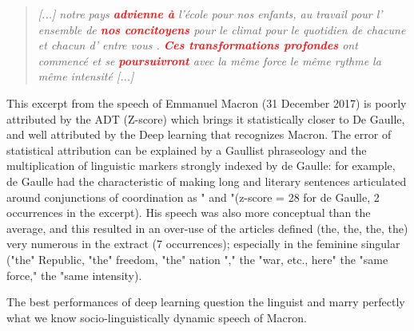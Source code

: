 \begin{quote}
\textit{[...] notre pays \textcolor{red}{\textbf{advienne à}} l'école pour nos enfants, au travail pour l' ensemble de \textcolor{red}{\textbf{nos concitoyens}} pour le climat pour le quotidien de chacune et chacun d' entre vous . \textcolor{red}{\textbf{Ces transformations profondes}} ont commencé et se \textcolor{red}{\textbf{poursuivront}} avec la même force le même rythme la même intensité [...]} 
\end{quote}

This excerpt from the speech of Emmanuel Macron (31 December 2017) is poorly attributed by the ADT (Z-score) which brings it statistically closer to De Gaulle, and well attributed by the Deep learning that recognizes Macron.
The error of statistical attribution can be explained by a Gaullist phraseology and the multiplication of linguistic markers strongly indexed by de Gaulle: for example, de Gaulle had the characteristic of making long and literary sentences articulated around conjunctions of coordination as " and "(z-score = 28 for de Gaulle, 2 occurrences in the excerpt). His speech was also more conceptual than the average, and this resulted in an over-use of the articles defined (the, the, the, the) very numerous in the extract (7 occurrences); especially in the feminine singular ("the" Republic, "the" freedom, "the" nation "," the "war, etc., here" the "same force," the "same intensity).

The best performances of deep learning question the linguist and marry perfectly what we know socio-linguistically dynamic speech of Macron.

